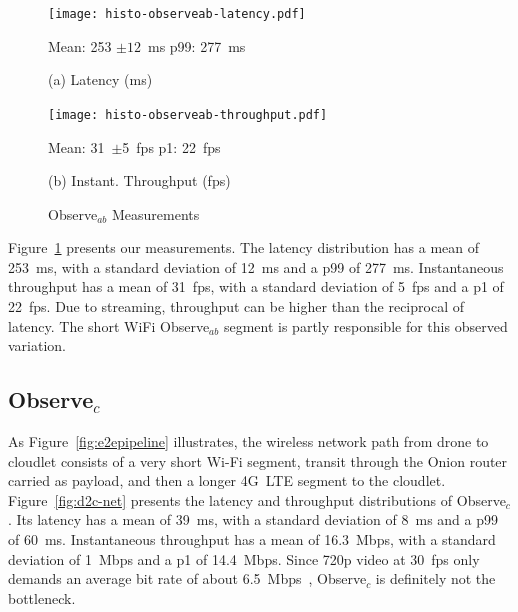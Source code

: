 \begin{figure}
\centering

\begin{minipage}[b]{.49\linewidth}
\centering
\texttt{[image: histo-observeab-latency.pdf]}
\begin{captext}
\centering
Mean: 253 $\pm 12$~ms\; p99: 277~ms\\
\end{captext}
\vspace{-0.05in}
{\small (a) Latency (ms)}
\end{minipage}
\begin{minipage}[b]{.49\linewidth}
\centering
\texttt{[image: histo-observeab-throughput.pdf]}
\begin{captext}
\centering
Mean: 31~$\pm$5~fps\; p1: 22~fps\\
\end{captext}
\vspace{-0.05in}
{\small (b) Instant. Throughput (fps)}
\end{minipage}
\caption{\small Observe$_{ab}$ Measurements}
\label{fig:d2c-drone-histo}
\vspace{-0.1in}
\end{figure}

Figure~\ref{fig:d2c-drone-histo} presents our measurements.  The
latency distribution has a mean of 253~ms, with a standard deviation
of 12~ms and a p99 of 277~ms.  Instantaneous throughput has a mean of
31~fps, with a standard deviation of 5~fps and a p1 of 22~fps.  Due to
streaming, throughput can be higher than the reciprocal of latency.
The short WiFi Observe$_{ab}$ segment is partly responsible for this observed variation.

\subsection{Observe$_c$}
\label{sec:netdownlink}

As Figure~\ref{fig:e2epipeline} illustrates, the wireless network path
from drone to cloudlet consists of a very short Wi-Fi segment, transit
through the Onion router carried as payload, and then a longer 4G~LTE
segment to the cloudlet.  Figure~\ref{fig:d2c-net} presents the
latency and throughput distributions of Observe$_c$.  Its latency has
a mean of 39~ms, with a standard deviation of 8~ms and a p99 of 60~ms.
Instantaneous throughput has a mean of 16.3~Mbps, with a standard
deviation of 1~Mbps and a p1 of 14.4~Mbps.  Since 720p video at 30~fps
only demands an average bit rate of about 6.5~Mbps~\cite{Adobe2024},
Observe$_c$ is definitely not the bottleneck.


